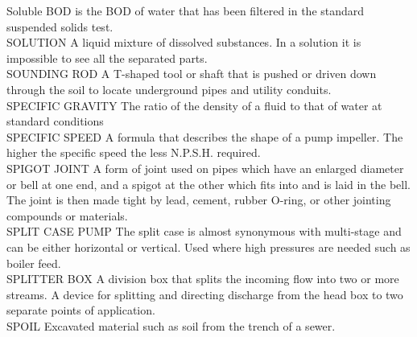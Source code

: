 Soluble BOD is the BOD of water that has been filtered in the standard suspended solids test.
\vspace{0.3cm}\\
SOLUTION
A liquid mixture of dissolved substances. In a solution it is impossible to see all the separated parts.
\vspace{0.3cm}\\
SOUNDING ROD
A T-shaped tool or shaft that is pushed or driven down through the soil to locate underground pipes and utility conduits. 
\vspace{0.3cm}\\
SPECIFIC GRAVITY
The ratio of the density of a fluid to that of water at standard conditions
\vspace{0.3cm}\\
SPECIFIC SPEED
A formula that describes the shape of a pump impeller. The higher the specific speed the less N.P.S.H. required.
\vspace{0.3cm}\\
SPIGOT JOINT
A form of joint used on pipes which have an enlarged diameter or bell at one end, and a spigot at the other which fits into and is laid in the bell. The joint is then made tight by lead, cement, rubber O-ring, or other jointing compounds or materials. 
\vspace{0.3cm}\\
SPLIT CASE PUMP
The split case is almost synonymous with multi-stage and can be either horizontal or vertical. Used where high pressures are needed such as boiler feed.
\vspace{0.3cm}\\
SPLITTER BOX
A division box that splits the incoming flow into two or more streams. A device for splitting and directing discharge from the head box to two separate points of application.
\vspace{0.3cm}\\
SPOIL
Excavated material such as soil from the trench of a sewer. 
\vspace{0.3cm}\\

